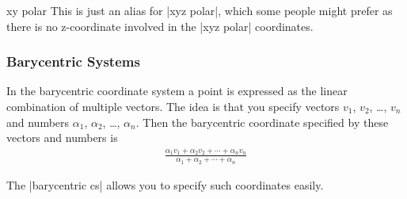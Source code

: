\begin{coordinatesystem}{xy polar}
    This is just an alias for |xyz polar|, which some people might prefer as
    there is no z-coordinate involved in the |xyz polar| coordinates.
\end{coordinatesystem}


\subsubsection{Barycentric Systems}
\label{section-barycentric-coordinates}

In the barycentric coordinate system a point is expressed as the linear
combination of multiple vectors. The idea is that you specify vectors $v_1$,
$v_2$, \dots, $v_n$ and numbers $\alpha_1$, $\alpha_2$, \dots, $\alpha_n$. Then
the barycentric coordinate specified by these vectors and numbers is
%
\begin{align*}
    \frac{\alpha_1 v_1 + \alpha_2 v_2 + \cdots + \alpha_n v_n}{\alpha_1
        + \alpha_2 + \cdots + \alpha_n}
\end{align*}

The |barycentric cs| allows you to specify such coordinates easily.

